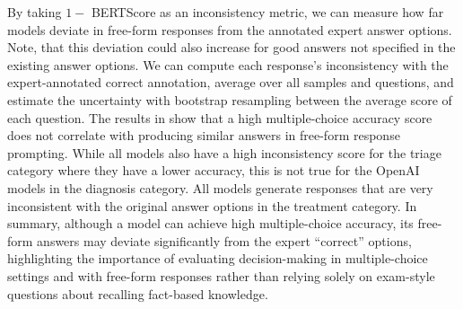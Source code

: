 By taking $1 -$ BERTScore as an inconsistency metric, we can measure how far models deviate in free-form responses from the annotated expert answer options.
Note, that this deviation could also increase for good answers not specified in the existing answer options.
We can compute each response's inconsistency with the expert-annotated correct annotation, average over all samples and questions, and estimate the uncertainty with bootstrap resampling between the average score of each question.
The results in  show that a high multiple-choice accuracy score does not correlate with producing similar answers in free-form response prompting.
While all models also have a high inconsistency score for the triage category where they have a lower accuracy, this is not true for the OpenAI models in the diagnosis category.
All models generate responses that are very inconsistent with the original answer options in the treatment category.
In summary, although a model can achieve high multiple-choice accuracy, its free-form answers may deviate significantly from the expert “correct” options, highlighting the importance of evaluating decision-making in multiple-choice settings and with free-form responses rather than relying solely on exam-style questions about recalling fact-based knowledge.
